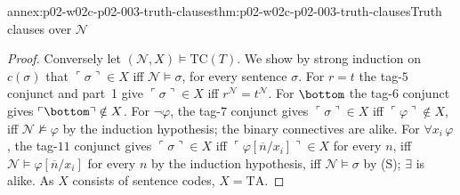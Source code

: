 \begin{annexitem}{annex:p02-w02c-p02-003-truth-clauses}{thm:p02-w02c-p02-003-truth-clauses}{Truth clauses over \(\mathcal N\)}
\begin{proof}
Conversely let \((\mathcal N,X)\models\mathrm{TC}(T)\).  We show by strong
induction on \(c(\sigma)\) that \(\ulcorner\sigma\urcorner\in X\) iff
\(\mathcal N\models\sigma\), for every sentence \(\sigma\).  For \(r=t\) the
tag-\(5\) conjunct and part~1 give \(\ulcorner\sigma\urcorner\in X\) iff
\(r^{\mathcal N}=t^{\mathcal N}\).  For \(\bottom\) the tag-\(6\) conjunct
gives \(\ulcorner\bottom\urcorner\notin X\).  For \(\neg\varphi\), the
tag-\(7\) conjunct gives \(\ulcorner\sigma\urcorner\in X\) iff
\(\ulcorner\varphi\urcorner\notin X\), iff \(\mathcal N\not\models\varphi\)
by the induction hypothesis; the binary connectives are alike.  For
\(\forall x_i\,\varphi\), the tag-\(11\) conjunct gives
\(\ulcorner\sigma\urcorner\in X\) iff
\(\ulcorner\varphi[\overline n/x_i]\urcorner\in X\) for every \(n\), iff
\(\mathcal N\models\varphi[\overline n/x_i]\) for every \(n\) by the
induction hypothesis, iff \(\mathcal N\models\sigma\) by (S); \(\exists\)
is alike.  As \(X\) consists of sentence codes, \(X=\mathrm{TA}\).
\end{proof}
\end{annexitem}

